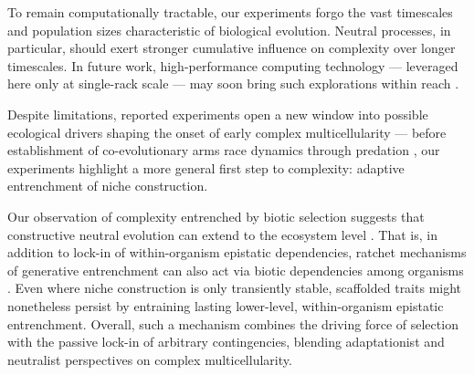 To remain computationally tractable, our experiments forgo the vast timescales and population sizes characteristic of biological evolution.
Neutral processes, in particular, should exert stronger cumulative influence on complexity over longer timescales.
In future work, high-performance computing technology --- leveraged here only at single-rack scale --- may soon bring such explorations within reach \citep{ackley2014indefinitely,moreno2024trackable,heinemann2007artificial,moreno2026trust,roy2026search}.

Despite limitations, reported experiments open a new window into possible ecological drivers shaping the onset of early complex multicellularity --- before establishment of co-evolutionary arms race dynamics through predation \citep{Tong2022,Dawkins1979}, our experiments highlight a more general first step to complexity: adaptive entrenchment of niche construction.

Our observation of complexity entrenched by biotic selection suggests that constructive neutral evolution can extend to the ecosystem level \citep{muozgmez2021constructive}.
That is, in addition to lock-in of within-organism epistatic dependencies, ratchet mechanisms of generative entrenchment can also act via biotic dependencies among organisms \citep{Waddington2008}.
Even where niche construction is only transiently stable, scaffolded traits might nonetheless persist by entraining lasting lower-level, within-organism epistatic entrenchment.
Overall, such a mechanism combines the driving force of selection with the passive lock-in of arbitrary contingencies, blending adaptationist and neutralist perspectives on complex multicellularity. 


